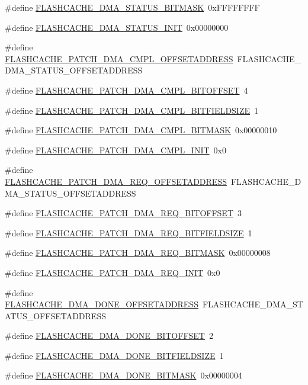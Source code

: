\begin{DoxyCompactItemize}
\item 
\#define \hyperlink{a00550_ad80dade8577fa9e561bdca03214f74fa}{FLASHCACHE\_\-DMA\_\-STATUS\_\-BITMASK}~0xFFFFFFFF
\item 
\#define \hyperlink{a00550_a616f1749e78e258926862cac48cc6a7a}{FLASHCACHE\_\-DMA\_\-STATUS\_\-INIT}~0x00000000
\item 
\#define \hyperlink{a00550_a3d34976a7e11f6205c8aa49ff99761d9}{FLASHCACHE\_\-PATCH\_\-DMA\_\-CMPL\_\-OFFSETADDRESS}~FLASHCACHE\_\-DMA\_\-STATUS\_\-OFFSETADDRESS
\item 
\#define \hyperlink{a00550_a3d9671efb166843d863e7da8ac703e66}{FLASHCACHE\_\-PATCH\_\-DMA\_\-CMPL\_\-BITOFFSET}~4
\item 
\#define \hyperlink{a00550_a5de04ae6fe9c6d20784be98b9f31ee24}{FLASHCACHE\_\-PATCH\_\-DMA\_\-CMPL\_\-BITFIELDSIZE}~1
\item 
\#define \hyperlink{a00550_a7a340a1fe6aca636888e917d7646e5b6}{FLASHCACHE\_\-PATCH\_\-DMA\_\-CMPL\_\-BITMASK}~0x00000010
\item 
\#define \hyperlink{a00550_af6399f7c00cbe9c88baf5c508bf94799}{FLASHCACHE\_\-PATCH\_\-DMA\_\-CMPL\_\-INIT}~0x0
\item 
\#define \hyperlink{a00550_a61f10fdde0ac96e64881259d37a33473}{FLASHCACHE\_\-PATCH\_\-DMA\_\-REQ\_\-OFFSETADDRESS}~FLASHCACHE\_\-DMA\_\-STATUS\_\-OFFSETADDRESS
\item 
\#define \hyperlink{a00550_a90ab1f6f3987f858fdd84278dde26cd6}{FLASHCACHE\_\-PATCH\_\-DMA\_\-REQ\_\-BITOFFSET}~3
\item 
\#define \hyperlink{a00550_a165313b785a9433cd2345b12140fadca}{FLASHCACHE\_\-PATCH\_\-DMA\_\-REQ\_\-BITFIELDSIZE}~1
\item 
\#define \hyperlink{a00550_a5489c8aff59640ae099a388da6fc102b}{FLASHCACHE\_\-PATCH\_\-DMA\_\-REQ\_\-BITMASK}~0x00000008
\item 
\#define \hyperlink{a00550_a3d19a583b1a0c7dea3582ba94a9e514d}{FLASHCACHE\_\-PATCH\_\-DMA\_\-REQ\_\-INIT}~0x0
\item 
\#define \hyperlink{a00550_a48e5bb3420142f4828aa6ebe544fa0df}{FLASHCACHE\_\-DMA\_\-DONE\_\-OFFSETADDRESS}~FLASHCACHE\_\-DMA\_\-STATUS\_\-OFFSETADDRESS
\item 
\#define \hyperlink{a00550_a9e1ead07a00c909b32aa36ebf61fff14}{FLASHCACHE\_\-DMA\_\-DONE\_\-BITOFFSET}~2
\item 
\#define \hyperlink{a00550_a05a817ed71613198d25b02839d302e6f}{FLASHCACHE\_\-DMA\_\-DONE\_\-BITFIELDSIZE}~1
\item 
\#define \hyperlink{a00550_a45b726a637f139d521b1baa6b740219d}{FLASHCACHE\_\-DMA\_\-DONE\_\-BITMASK}~0x00000004

\end{DoxyCompactItemize}
